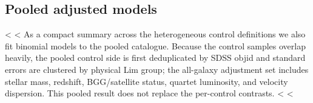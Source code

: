 \documentclass{aa}
\newcommand{\CG}{CG\textsubscript{4}}
\begin{document}
\begin{appendix}
\subsection{Pooled adjusted models}\label{app:pooled_adjusted}
<%
<%
As a compact summary across the heterogeneous control definitions we also fit binomial models to the pooled catalogue. Because the control samples overlap heavily, the pooled control side is first deduplicated by SDSS objid and standard errors are clustered by physical Lim group; the all-galaxy adjustment set includes stellar mass, redshift, BGG/satellite status, quartet luminosity, and velocity dispersion. This pooled result does not replace the per-control contrasts. <%
<%


\end{appendix}
\end{document}
